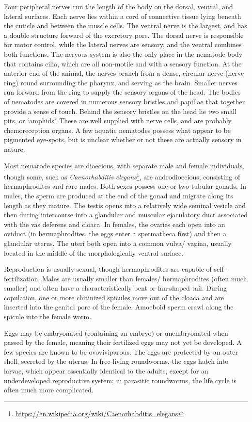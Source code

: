 \documentclass[]{book}
\let\rmarkdownfootnote\footnote%
\def\footnote{\protect\rmarkdownfootnote}
\renewcommand{\href}[2]{#2\footnote{\url{#1}}}
\begin{document}
Four peripheral nerves run the length of the body on the dorsal, ventral, and lateral surfaces. Each nerve lies within a cord of connective tissue lying beneath the cuticle and between the muscle cells. The ventral nerve is the largest, and has a double structure forward of the excretory pore. The dorsal nerve is responsible for motor control, while the lateral nerves are sensory, and the ventral combines both functions. The nervous system is also the only place in the nematode body that contains cilia, which are all non-motile and with a sensory function. At the anterior end of the animal, the nerves branch from a dense, circular nerve (nerve ring) round surrounding the pharynx, and serving as the brain. Smaller nerves run forward from the ring to supply the sensory organs of the head. The bodies of nematodes are covered in numerous sensory bristles and papillae that together provide a sense of touch. Behind the sensory bristles on the head lie two small pits, or `amphids'. These are well supplied with nerve cells, and are probably chemoreception organs. A few aquatic nematodes possess what appear to be pigmented eye-spots, but is unclear whether or not these are actually sensory in nature.

Most nematode species are dioecious, with separate male and female individuals, though some, such as \href{https://en.wikipedia.org/wiki/Caenorhabditis_elegans}{\emph{Caenorhabditis elegans}}, are androdioecious, consisting of hermaphrodites and rare males. Both sexes possess one or two tubular gonads. In males, the sperm are produced at the end of the gonad and migrate along its length as they mature. The testis opens into a relatively wide seminal vesicle and then during intercourse into a glandular and muscular ejaculatory duct associated with the vas deferens and cloaca. In females, the ovaries each open into an oviduct (in hermaphrodites, the eggs enter a spermatheca first) and then a glandular uterus. The uteri both open into a common vulva/ vagina, usually located in the middle of the morphologically ventral surface.

Reproduction is usually sexual, though hermaphrodites are capable of self-fertilization. Males are usually smaller than females/ hermaphrodites (often much smaller) and often have a characteristically bent or fan-shaped tail. During copulation, one or more chitinized spicules move out of the cloaca and are inserted into the genital pore of the female. Amoeboid sperm crawl along the spicule into the female worm.

Eggs may be embryonated (containing an embryo) or unembryonated when passed by the female, meaning their fertilized eggs may not yet be developed. A few species are known to be ovoviviparous. The eggs are protected by an outer shell, secreted by the uterus. In free-living roundworms, the eggs hatch into larvae, which appear essentially identical to the adults, except for an underdeveloped reproductive system; in parasitic roundworms, the life cycle is often much more complicated.
\end{document}
